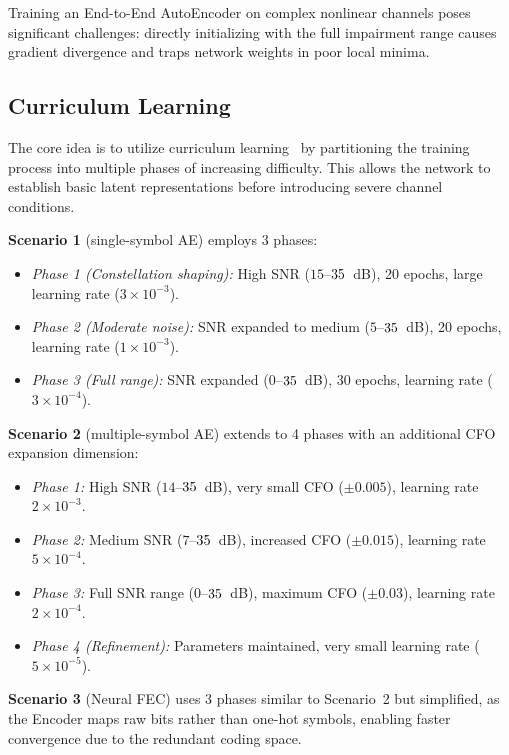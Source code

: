 \documentclass{JECnew}
\begin{document}
Training an End-to-End AutoEncoder on complex nonlinear channels poses significant challenges: directly initializing with the full impairment range causes gradient divergence and traps network weights in poor local minima.

\subsection{Curriculum Learning}

The core idea is to utilize curriculum learning{\color{blue}~\cite{bengio2009}} by partitioning the training process into multiple phases of increasing difficulty. This allows the network to establish basic latent representations before introducing severe channel conditions.

\textbf{Scenario 1} (single-symbol AE) employs 3 phases:
\begin{itemize}
    \item \emph{Phase 1 (Constellation shaping):} High SNR ($15$--${\color{blue}35}$~dB), 20 epochs, large learning rate ($3 \times 10^{-3}$).
    \item \emph{Phase 2 (Moderate noise):} SNR expanded to medium ($5$--${\color{blue}35}$~dB), 20 epochs, learning rate ($1 \times 10^{-3}$).
    \item \emph{Phase 3 (Full range):} SNR expanded ($0$--${\color{blue}35}$~dB), 30 epochs, learning rate ($3 \times 10^{-4}$).
\end{itemize}

\textbf{Scenario 2} (multiple-symbol AE) extends to 4 phases with an additional CFO expansion dimension:
\begin{itemize}
    \item \emph{Phase 1:} High SNR ($14$--${\color{blue}35}$~dB), very small CFO ($\pm 0.005$), learning rate $2 \times 10^{-3}$.
    \item \emph{Phase 2:} Medium SNR ($7$--${\color{blue}35}$~dB), increased CFO ($\pm 0.015$), learning rate $5 \times 10^{-4}$.
    \item \emph{Phase 3:} Full SNR range ($0$--${\color{blue}35}$~dB), maximum CFO ($\pm 0.03$), learning rate $2 \times 10^{-4}$.
    \item \emph{Phase 4 (Refinement):} Parameters maintained, very small learning rate ($5 \times 10^{-5}$).
\end{itemize}

\textbf{Scenario 3} (Neural FEC) uses 3 phases similar to Scenario~2 but simplified, as the Encoder maps raw bits rather than one-hot symbols, enabling faster convergence due to the redundant coding space.
\end{document}
